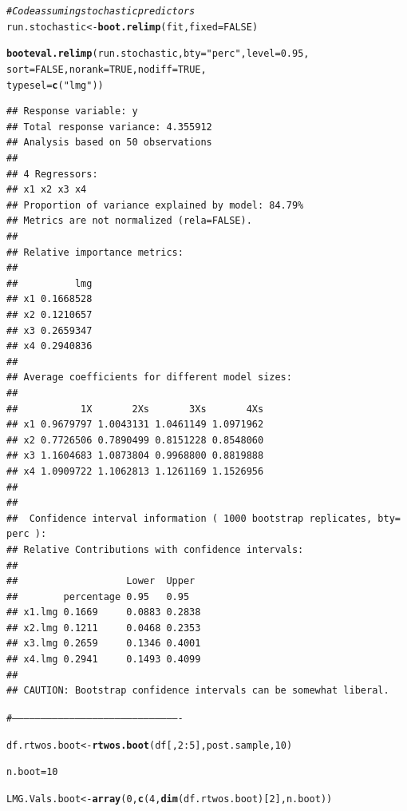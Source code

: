\documentclass[11pt,a4paper,twoside]{book}\usepackage[]{graphicx}\usepackage[]{color}
\makeatletter
\newcommand{\hlnum}[1]{\textcolor[rgb]{0.686,0.059,0.569}{#1}}%
\newcommand{\hlstr}[1]{\textcolor[rgb]{0.192,0.494,0.8}{#1}}%
\newcommand{\hlcom}[1]{\textcolor[rgb]{0.678,0.584,0.686}{\textit{#1}}}%
\newcommand{\hlopt}[1]{\textcolor[rgb]{0,0,0}{#1}}%
\newcommand{\hlstd}[1]{\textcolor[rgb]{0.345,0.345,0.345}{#1}}%
\newcommand{\hlkwb}[1]{\textcolor[rgb]{0.69,0.353,0.396}{#1}}%
\newcommand{\hlkwc}[1]{\textcolor[rgb]{0.333,0.667,0.333}{#1}}%
\newcommand{\hlkwd}[1]{\textcolor[rgb]{0.737,0.353,0.396}{\textbf{#1}}}%
\newenvironment{kframe}{%
 \def\at@end@of@kframe{}%
 \ifinner\ifhmode%
  \def\at@end@of@kframe{\end{minipage}}%
  \begin{minipage}{\columnwidth}%
 \fi\fi%
 \def\FrameCommand##1{\hskip\@totalleftmargin \hskip-\fboxsep
 \colorbox{shadecolor}{##1}\hskip-\fboxsep
     \hskip-\linewidth \hskip-\@totalleftmargin \hskip\columnwidth}%
 \MakeFramed {\advance\hsize-\width
   \@totalleftmargin\z@ \linewidth\hsize
   \@setminipage}}%
 {\par\unskip\endMakeFramed%
 \at@end@of@kframe}
\newenvironment{knitrout}{}{} %
\makeatother
\begin{document}
\begin{knitrout}
\color{fgcolor}\begin{kframe}
\begin{alltt}
\hlcom{#Code assuming stochastic predictors}
\hlstd{run.stochastic}\hlkwb{<-}\hlkwd{boot.relimp}\hlstd{(fit,} \hlkwc{fixed}\hlstd{=}\hlnum{FALSE}\hlstd{)}

\hlkwd{booteval.relimp}\hlstd{(run.stochastic,} \hlkwc{bty} \hlstd{=} \hlstr{"perc"}\hlstd{,} \hlkwc{level} \hlstd{=} \hlnum{0.95}\hlstd{,}
                \hlkwc{sort} \hlstd{=} \hlnum{FALSE}\hlstd{,} \hlkwc{norank} \hlstd{=} \hlnum{TRUE}\hlstd{,} \hlkwc{nodiff} \hlstd{=} \hlnum{TRUE}\hlstd{,}
                \hlkwc{typesel} \hlstd{=} \hlkwd{c}\hlstd{(}\hlstr{"lmg"}\hlstd{))}
\end{alltt}
\begin{verbatim}
## Response variable: y 
## Total response variance: 4.355912 
## Analysis based on 50 observations 
## 
## 4 Regressors: 
## x1 x2 x3 x4 
## Proportion of variance explained by model: 84.79%
## Metrics are not normalized (rela=FALSE). 
## 
## Relative importance metrics: 
## 
##          lmg
## x1 0.1668528
## x2 0.1210657
## x3 0.2659347
## x4 0.2940836
## 
## Average coefficients for different model sizes: 
## 
##           1X       2Xs       3Xs       4Xs
## x1 0.9679797 1.0043131 1.0461149 1.0971962
## x2 0.7726506 0.7890499 0.8151228 0.8548060
## x3 1.1604683 1.0873804 0.9968800 0.8819888
## x4 1.0909722 1.1062813 1.1261169 1.1526956
## 
##  
##  Confidence interval information ( 1000 bootstrap replicates, bty= perc ): 
## Relative Contributions with confidence intervals: 
##  
##                   Lower  Upper
##        percentage 0.95   0.95  
## x1.lmg 0.1669     0.0883 0.2838
## x2.lmg 0.1211     0.0468 0.2353
## x3.lmg 0.2659     0.1346 0.4001
## x4.lmg 0.2941     0.1493 0.4099
## 
## CAUTION: Bootstrap confidence intervals can be somewhat liberal.
\end{verbatim}
\begin{alltt}
\hlcom{#----------------------------------------------------------------------------------------}


\hlstd{df.rtwos.boot} \hlkwb{<-}\hlkwd{rtwos.boot}\hlstd{(df[,}\hlnum{2}\hlopt{:}\hlnum{5}\hlstd{], post.sample,} \hlnum{10}\hlstd{)}

\hlstd{n.boot} \hlkwb{=} \hlnum{10}

\hlstd{LMG.Vals.boot}\hlkwb{<-}\hlkwd{array}\hlstd{(}\hlnum{0}\hlstd{,} \hlkwd{c}\hlstd{(}\hlnum{4}\hlstd{,}\hlkwd{dim}\hlstd{(df.rtwos.boot)[}\hlnum{2}\hlstd{], n.boot))}


\end{alltt}
\end{kframe}
\end{knitrout}
\end{document}
